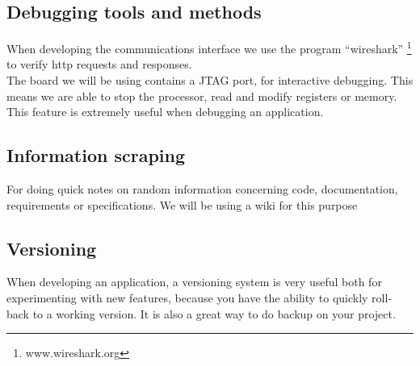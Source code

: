 \subsection{Debugging tools and methods}
When developing the communications interface we use the program ``wireshark'' \footnote{www.wireshark.org} to verify http requests and responses.\\
The board we will be using contains a JTAG port, for interactive debugging. This means we are able to stop the processor, read and modify registers or memory. This feature is extremely useful when debugging an application.

\subsection{Information scraping}
For doing quick notes on random information concerning code, documentation, requirements or specifications. We will be using a wiki for this purpose

\subsection{Versioning}
When developing an application, a versioning system is very useful both for experimenting with new features, because you have the ability to quickly roll-back to a working version. It is also a great way to do backup on your project.
